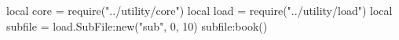 \documentclass[11pt, a4paper]{ltjsbook}
\date{\today}
\title{}
\author{}
\begin{document}
\maketitle
\tableofcontents

\begin{luacode*}
    local core = require("../utility/core")
    local load = require("../utility/load")
    local subfile = load.SubFile:new("sub", 0, 10)
    subfile:book()
\end{luacode*}



\end{document}
